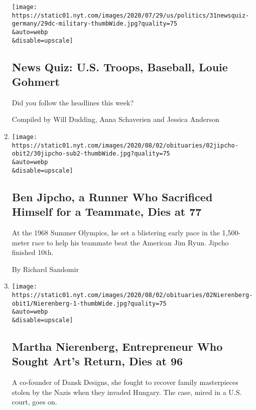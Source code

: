 \begin{enumerate}
  \texttt{[image: https://static01.nyt.com/images/2020/07/29/us/politics/31newsquiz-germany/29dc-military-thumbWide.jpg?quality=75\\\&auto=webp\\\&disable=upscale]}

  \hypertarget{news-quiz-us-troops-baseball-louie-gohmert}{%
  \subsection{News Quiz: U.S. Troops, Baseball, Louie
  Gohmert}\label{news-quiz-us-troops-baseball-louie-gohmert}}

  Did you follow the headlines this week?

  Compiled by Will Dudding, Anna Schaverien and Jessica Anderson
\item
  \href{/2020/07/30/sports/olympics/ben-jipcho-dead.html}{}

  \texttt{[image: https://static01.nyt.com/images/2020/08/02/obituaries/02jipcho-obit2/30jipcho-sub2-thumbWide.jpg?quality=75\\\&auto=webp\\\&disable=upscale]}

  \hypertarget{ben-jipcho-a-runner-who-sacrificed-himself-for-a-teammate-dies-at-77}{%
  \subsection{Ben Jipcho, a Runner Who Sacrificed Himself for a
  Teammate, Dies at
  77}\label{ben-jipcho-a-runner-who-sacrificed-himself-for-a-teammate-dies-at-77}}

  At the 1968 Summer Olympics, he set a blistering early pace in the
  1,500-meter race to help his teammate beat the American Jim Ryun.
  Jipcho finished 10th.

  By Richard Sandomir
\item
  \href{/2020/07/30/arts/martha-nierenberg-entrepreneur-who-sought-arts-return-dies-at-96.html}{}

  \texttt{[image: https://static01.nyt.com/images/2020/08/02/obituaries/02Nierenberg-obit1/Nierenberg-1-thumbWide.jpg?quality=75\\\&auto=webp\\\&disable=upscale]}

  \hypertarget{martha-nierenberg-entrepreneur-who-sought-arts-return-dies-at-96}{%
  \subsection{Martha Nierenberg, Entrepreneur Who Sought Art's Return,
  Dies at
  96}\label{martha-nierenberg-entrepreneur-who-sought-arts-return-dies-at-96}}

  A co-founder of Dansk Designs, she fought to recover family
  masterpieces stolen by the Nazis when they invaded Hungary. The case,
  mired in a U.S. court, goes on.


\end{enumerate}
